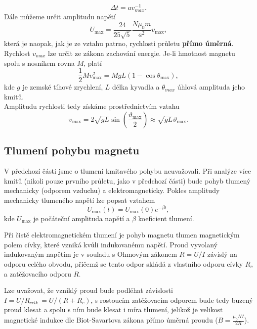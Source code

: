 \documentclass[czech,11pt,a4paper]{article}
\begin{document}
	\begin{equation}
		\Delta t = a v^{-1}_{max}.
	\end{equation}
	Dále můžeme určit amplitudu napětí
	\begin{equation}
		U_{\max }=\frac{24}{25 \sqrt{5}} \frac{N \mu_0 m}{a^2} v_{\max },
	\end{equation}
	která je naopak, jak je ze vztahu patrno, rychlosti průletu \textbf{přímo úměrná}.
	Rychlost $v_{max}$ lze určit ze zákona zachování energie. Je-li hmotnost magnetu spolu s nosníkem rovna $M$, platí
	\begin{equation}
		\frac{1}{2} M v_{\max }^2=M g L\left(1-\cos \theta_{\max }\right),
	\end{equation}
	kde $g$ je zemské tíhové zrychlení, $L$ délka kyvadla a $\theta_{max}$ úhlová amplituda jeho kmitů. \\
	Amplitudu rychlosti tedy získáme prostřednictvím vztahu
	\begin{equation}
		v_{\max }=2 \sqrt{g L} \sin \left(\frac{\vartheta_{\max }}{2}\right) \approx \sqrt{g L} \vartheta_{\max }.
	\end{equation}
	
	
	\subsection{Tlumení pohybu magnetu}
	V předchozí části jsme o tlumení kmitavého pohybu neuvažovali. Při analýze více kmitů (nikoli pouze prvního průletu, jako v předchozí části) bude pohyb tlumený mechanicky (odporem vzduchu) a elektromagneticky.
	Pokles amplitudy mechanicky tlumeného napětí lze popsat vztahem 
	\begin{equation}
		U _{\max}(t) = U_{\max}(0) e^{-\beta t} ,
	\end{equation}
	kde $U_{\max}$ je počáteční amplituda napětí a $\beta$ koeficient tlumení.

	Při čistě elektromagnetickém tlumení je pohyb magnetu tlumen magnetickým polem cívky, které vzniká kvůli indukovanému napětí. Proud vyvolaný indukovaným napětím je v souladu s Ohmovým zákonem $ R = U/I$ závislý na odporu celého obvodu, přičemž se tento odpor skládá z vlastního odporu cívky $R_c$ a zatěžovacího odporu $R$. 
	
	Lze uvažovat, že vzniklý proud bude podléhat závislosti $I = U/R_{celk.} = U / (R+R_c)$, s rostoucím zatěžovacím odporem bude tedy buzený proud klesat a spolu s ním bude klesat i míra tlumení, jelikož je velikost magnetické indukce dle Biot-Savartova zákona přímo úměrná proudu ($B = \frac {\mu_0 N I}{2R}  $).
	
\end{document}

